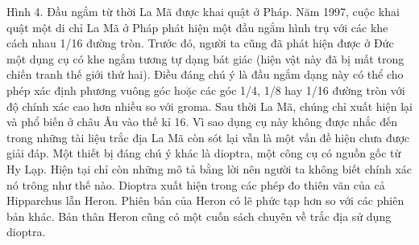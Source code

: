 \begin{multicols}{2}
	Hình 4. Đầu ngắm từ thời La Mã được khai quật ở Pháp.
	Năm 1997, cuộc khai quật một di chỉ La Mã ở Pháp phát hiện một đầu ngắm hình trụ với các khe cách nhau 1/16 đường tròn. Trước đó, người ta cũng đã phát hiện được ở Đức một dụng cụ có khe ngắm tương tự dạng bát giác (hiện vật này đã bị mất trong chiến tranh thế giới thứ hai). Điều đáng chú ý là đầu ngắm dạng này có thể cho phép xác định phương vuông góc hoặc các góc 1/4, 1/8 hay 1/16  đường tròn với độ chính xác cao hơn nhiều so với groma. Sau thời La Mã, chúng chỉ xuất hiện lại và phổ biến ở châu Âu vào thế kỉ 16. Vì sao dụng cụ này không được nhắc đến trong những tài liệu trắc địa La Mã còn sót lại vẫn là một vấn đề hiện chưa được giải đáp.
	Một thiết bị đáng chú ý khác là dioptra, một công cụ có nguồn gốc từ Hy Lạp. Hiện tại chỉ còn những mô tả bằng lời nên người ta không biết chính xác nó trông như thế nào. Dioptra xuất hiện trong các phép đo thiên văn của cả Hipparchus lẫn Heron. Phiên bản của Heron có lẽ phức tạp hơn so với các phiên bản khác. Bản thân Heron cũng có một cuốn sách chuyên về trắc địa sử dụng dioptra.
	
	
	

\end{multicols}
